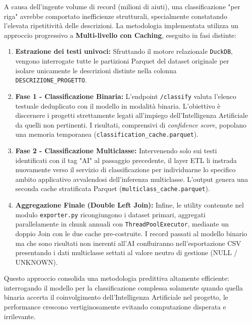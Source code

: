 A causa dell'ingente volume di record (milioni di aiuti), una classificazione "per riga" avrebbe comportato inefficienze strutturali, specialmente constatando l'elevata ripetitività delle descrizioni. La metodologia implementata utilizza un approccio progressivo a \textbf{Multi-livello con Caching}, eseguito in fasi distinte:

\begin{enumerate}
    \item \textbf{Estrazione dei testi univoci:} Sfruttando il motore relazionale \texttt{DuckDB}, vengono interrogate tutte le partizioni Parquet del dataset originale per isolare unicamente le descrizioni distinte nella colonna \texttt{DESCRIZIONE\_PROGETTO}.
    \item \textbf{Fase 1 - Classificazione Binaria:} L'endpoint \texttt{/classify} valuta l'elenco testuale deduplicato con il modello in modalità binaria. L'obiettivo è discernere i progetti strettamente legati all'impiego dell'Intelligenza Artificiale da quelli non pertinenti. I risultati, comprensivi di \textit{confidence score}, popolano una memoria temporanea (\texttt{classification\_cache.parquet}).
    \item \textbf{Fase 2 - Classificazione Multiclasse:} Intervenendo solo sui testi identificati con il tag "AI" al passaggio precedente, il layer ETL li instrada nuovamente verso il servizio di classificazione per individuarne lo specifico ambito applicativo avvalendosi dell'inferenza multiclasse. L'output genera una seconda cache stratificata Parquet (\texttt{multiclass\_cache.parquet}).
    \item \textbf{Aggregazione Finale (Double Left Join):} Infine, le utility contenute nel modulo \texttt{exporter.py} ricongiungono i dataset primari, aggregati parallelamente in chunk annuali con \texttt{ThreadPoolExecutor}, mediante un doppio Join con le due cache pre-costruite. I record passati al modello binario ma che sono risultati non inerenti all'AI confluiranno nell'esportazione CSV presentando i dati multiclasse settati al valore neutro di gestione (NULL / UNKNOWN). 
\end{enumerate}

Questo approccio consolida una metodologia predittiva altamente efficiente: interrogando il modello per la classificazione complessa solamente quando quella binaria accerta il coinvolgimento dell'Intelligenza Artificiale nel progetto, le performance crescono vertiginosamente evitando computazione disperata e irrilevante.
